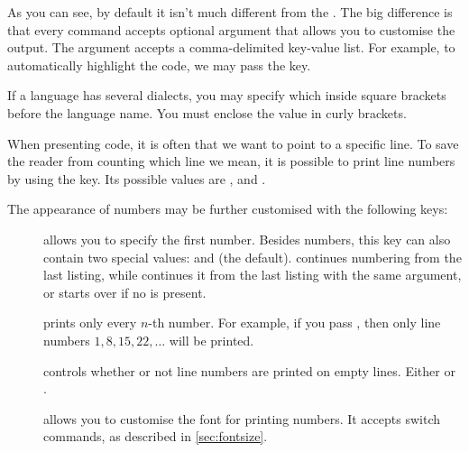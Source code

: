 As you can see, by default it isn't much different from the . The big difference is that every command accepts optional
argument that allows you to customise the output. The argument accepts a
comma-delimited key-value list. For example, to automatically highlight the
code, we may pass the  key.
\begin{example}[examplewidth=0.6\linewidth, vertical_mode]

\end{example}
If a language has several dialects, you may specify which inside square brackets
before the language name. You must enclose the value in curly brackets.
\begin{example}[examplewidth=0.8\linewidth, vertical_mode]
TeX}]{hello.tex}
\end{example}
When presenting code, it is often that we want to point to a specific line. To
save the reader from counting which line we mean, it is possible to print line
numbers by using the  key. Its possible values are ,
 and .
\begin{example}[examplewidth=0.8\linewidth, vertical_mode]
\lstset{xleftmargin=1.2em}%

\end{example}
The appearance of numbers may be further customised with the following keys:
\begin{description}
  \item[] allows you to specify the first number. Besides
    numbers, this key can also contain two special values:  and
     (the default).  continues numbering from the last
    listing, while  continues it from the last listing with the
    same  argument, or starts over if no  is present.
  \item[] prints only every \(n\)-th number. For
    example, if you pass , then only line numbers \(1, 8,
    15, 22, \ldots\) will be printed.
  \item[] controls whether or not line numbers are
    printed on empty lines. Either  or .
  \item[] allows you to customise the font for printing
    numbers. It accepts switch commands, as described in \autoref{sec:fontsize}.
\end{description}
\begin{example}[examplewidth=0.61\linewidth]

\end{example}


